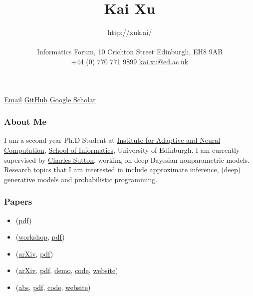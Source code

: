 \documentclass[11pt, a4paper]{article}
\title{Kai Xu} %
\date{} %
\author{http://xuk.ai/\\\\
Informatics Forum, 10 Crichton Street \textbar{} Edinburgh, EH8 9AB\\ %
+44 (0) 770 771 9899 \textbar{} kai.xu@ed.ac.uk } %
\providecommand{\tightlist}{%
  \setlength{\itemsep}{0pt}\setlength{\parskip}{0pt}}
\begin{document}

\maketitle
\begin{raggedright}
\href{mailto:kai.xu@ed.ac.uk}{Email} \textbar{}
\href{http://github.com/xukai92}{GitHub} \textbar{}
\href{https://scholar.google.ca/citations?user=kf3C60wAAAAJ}{Google
Scholar}

\subsubsection{About Me}

I am a second year Ph.D Student at
\href{http://www.anc.ed.ac.uk/}{Institute for Adaptive and Neural
Computation}, \href{https://www.ed.ac.uk/informatics}{School of
Informatics}, University of Edinburgh. I am currently supervised by
\href{http://homepages.inf.ed.ac.uk/csutton/}{Charles Sutton}, working
on deep Bayesian nonparametric models. Research topics that I am
interested in include approximate inference, (deep) generative models
and probabilistic programming.

\subsubsection{Papers}

\begin{itemize}
\tightlist
\item
  (\href{http://xuk.ai/assets/xu2019rave.pdf}{pdf})
\item
  (\href{https://sites.google.com/view/nipsbnp2018/accepted-papers}{workshop},
  \href{https://drive.google.com/file/d/1x-p13HC0SNTWcWcL_AspBS4OUBEGqn-a/view}{pdf})
\item
  (\href{https://arxiv.org/abs/1806.00101}{arXiv},
  \href{https://arxiv.org/pdf/1806.00101.pdf}{pdf})
\item
  (\href{https://arxiv.org/abs/1803.04042}{arXiv},
  \href{https://arxiv.org/pdf/1803.04042.pdf}{pdf},
  \href{http://xuk.ai/darksight/demo/mnist.html}{demo},
  \href{https://github.com/xukai92/darksight}{code},
  \href{http://xuk.ai/darksight/}{website})
\item
  (\href{http://proceedings.mlr.press/v84/ge18b.html}{abs},
  \href{http://proceedings.mlr.press/v84/ge18b/ge18b.pdf}{pdf},
  \href{https://github.com/yebai/Turing.jl}{code},
  \href{http://turing.guru/}{website})
\end{itemize}


\end{raggedright}
\end{document}
